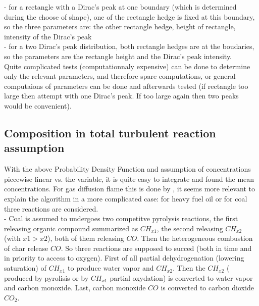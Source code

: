 - for a rectangle with a Dirac's peak at one boundary ({\small which
  is determined during the choose of shape}), one of the rectangle
  hedge is fixed at this boundary, so the three parameters are: the
  other rectangle hedge, height of rectangle, intensity of the Dirac's
  peak\\

- for a two Dirac's peak distribution, both rectangle hedges are at
   the boudaries, so the parameters are the rectangle height and the
   Dirac's peak intensity.\\

Quite complicated tests ({\small computationnaly expensive}) can be
done to determine only the relevant parameters, and therefore spare
computations, or general computaions of parameters can be done and
afterwards tested ({\small if rectangle too large then attempt with
one Dirac's peak. If too large again then two peaks would be
convenient}).
 
 

\subsection{Composition in total turbulent reaction assumption}

With the above Probability Density Function and assumption of
concentrations piecewise linear vs. the variable, it is quite easy to
integrate and found the mean concentrations. For gas diffusion flame
this is done by , it seems more relevant to
explain the algorithm in a more complicated case: for heavy fuel
oil  or for coal  three reactions are
considered. \\

- Coal is assumed to undergoes two competitve pyrolysis reactions, the
  first releasing organic compound summarized as $CH_{x1}$, the second
  releasing $CH_{x2}$ ({\small with $x1 > x2$}), both of them
  releasing $CO$. Then the heterogeneous combustion of char release
  $CO$. So three reactions are supposed to succed ({\small both in
  time and in priority to access to oxygen}). First of all partial
  dehydrogenation ({\small lowering saturation}) of $CH_{x1}$ to
  produce water vapor and $CH_{x2}$. Then the $CH_{x2}$ ({\small
  produced by pyrolisis or by $CH_{x1}$ partial oxydation}) is
  converted to water vapor and carbon monoxide. Last, carbon monoxide
  $CO$ is converted to carbon dioxide $CO_{2}$.\\

